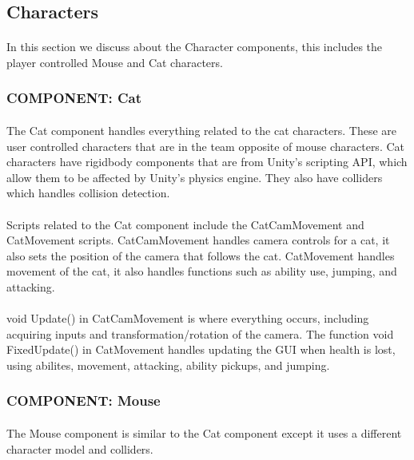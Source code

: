 \documentclass[12pt, titlepage]{article}
\begin{document}
\subsection{Characters}
\paragraph{} In this section we discuss about the Character components, this includes the player controlled Mouse and Cat characters.
\subsubsection{COMPONENT: Cat}
\paragraph{} The Cat component handles everything related to the cat characters. These are user controlled characters that are in the team opposite of mouse characters. Cat characters have rigidbody components that are from Unity's scripting API, which allow them to be affected by Unity's physics engine. They also have colliders which handles collision detection.
\paragraph{} Scripts related to the Cat component include the CatCamMovement and CatMovement scripts. CatCamMovement handles camera controls for a cat, it also sets the position of the camera that follows the cat. CatMovement handles movement of the cat, it also handles functions such as ability use, jumping, and attacking.
\paragraph{} void Update() in CatCamMovement is where everything occurs, including acquiring inputs and transformation/rotation of the camera. The function void FixedUpdate() in CatMovement handles updating the GUI when health is lost, using abilites, movement, attacking, ability pickups, and jumping.
\subsubsection{COMPONENT: Mouse}
\paragraph{} The Mouse component is similar to the Cat component except it uses a different character model and colliders.
\end{document}
